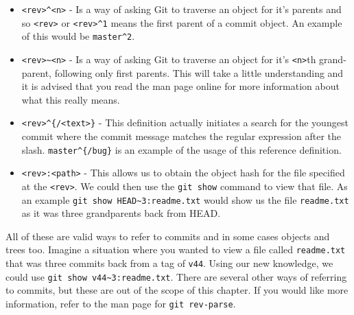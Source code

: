 \begin{itemize}
\item\texttt{<rev>\textasciicircum<n>} - Is a way of asking Git to traverse an object for it's parents and so \texttt{<rev>} or \texttt{<rev>\textasciicircum 1} means the first parent of a commit object.
An example of this would be \texttt{master\textasciicircum2}.
\item\texttt{<rev>\textasciitilde<n>} - Is a way of asking Git to traverse an object for it's \texttt{<n>}th grand-parent, following only first parents.
This will take a little understanding and it is advised that you read the man page online for more information about what this really means.
\item\texttt{<rev>\textasciicircum\{/<text>\}} - This definition actually initiates a search for the youngest commit where the commit message matches the regular expression after the slash.
\texttt{master\textasciicircum\{/bug\}} is an example of the usage of this reference definition.
\item\texttt{<rev>:<path>} - This allows us to obtain the object hash for the file specified at the \texttt{<rev>}.
We could then use the \texttt{git show} command to view that file.
As an example \texttt{git show HEAD\textasciitilde 3:readme.txt} would show us the file \texttt{readme.txt} as it was three grandparents back from HEAD.
\end{itemize}

All of these are valid ways to refer to commits and in some cases objects and trees too.
Imagine a situation where you wanted to view a file called \texttt{readme.txt} that was three commits back from a tag of \texttt{v44}.
Using our new knowledge, we could use \texttt{git show v44\textasciitilde 3:readme.txt}.
There are several other ways of referring to commits, but these are out of the scope of this chapter.
If you would like more information, refer to the man page for \texttt{git rev-parse}.
